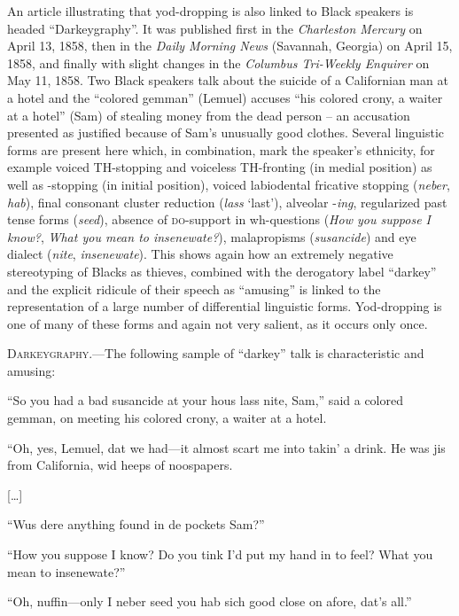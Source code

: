 An article illustrating that yod-dropping is also linked to Black speakers is headed “Darkeygraphy”. It was published first in the \emph{Charleston Mercury} on April 13, 1858, then in the \emph{Daily Morning News} (Savannah, Georgia) on April 15, 1858, and finally with slight changes in the \emph{Columbus Tri-Weekly Enquirer} on May 11, 1858. Two Black speakers talk about the suicide of a Californian man at a hotel and the “colored gemman” (Lemuel) accuses “his colored crony, a waiter at a hotel” (Sam) of stealing money from the dead person – an accusation presented as justified because of Sam’s unusually good clothes. Several linguistic forms are present here which, in combination, mark the speaker’s ethnicity, for example voiced TH-stopping and voiceless TH-fronting (in medial position) as well as -stopping (in initial position), voiced labiodental fricative stopping (\emph{neber}, \emph{hab}), final consonant cluster reduction (\emph{lass} ‘last’), alveolar -\emph{ing}, regularized past tense forms (\emph{seed}), absence of \textsc{do}{}-support in wh-questions (\emph{How you suppose I know?}, \emph{What you mean to insenewate?}), malapropisms (\emph{susancide}) and eye dialect (\emph{nite}, \emph{insenewate}). This shows again how an extremely negative stereotyping of Blacks as thieves, combined with the derogatory label “darkey” and the explicit ridicule of their speech as “amusing” is linked to the representation of a large number of differential linguistic forms. Yod-dropping is one of many of these forms and again not very salient, as it occurs only once.

\begin{ipquote}
\textsc{Darkeygraphy}.—The following sample of “darkey” talk is characteristic and amusing:

“So you had a bad susancide at your hous lass nite, Sam,” said a colored gemman, on meeting his colored crony, a waiter at a hotel.

{“Oh, yes, Lemuel, dat we had—it almost scart me into takin’ a drink. He was jis from California, wid heeps of noospapers.

\centering
{[…]}

“Wus dere anything found in de pockets Sam?”}

“How you suppose I know? Do you tink I’d put my hand in to feel? What you mean to insenewate?”

“Oh, nuffin—only I neber seed you hab sich good close on afore, dat’s all.”
\end{ipquote}

